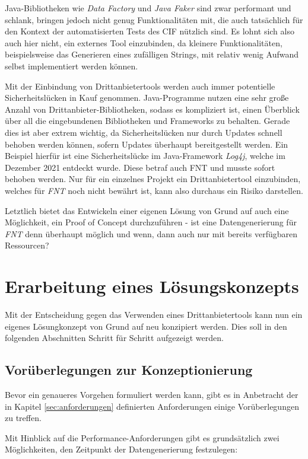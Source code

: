 Java-Bibliotheken wie \textit{Data Factory} und \textit{Java Faker} sind zwar performant und schlank, bringen jedoch nicht genug Funktionalitäten mit, die auch tatsächlich für den Kontext der automatisierten Tests des \ac{CIF} nützlich sind. Es lohnt sich also auch hier nicht, ein externes Tool einzubinden, da kleinere Funktionalitäten, beispielsweise das Generieren eines zufälligen Strings, mit relativ wenig Aufwand selbst implementiert werden können.

Mit der Einbindung von Drittanbietertools werden auch immer potentielle Sicherheitslücken in Kauf genommen. Java-Programme nutzen eine sehr große Anzahl von Drittanbieter-Bibliotheken, sodass es kompliziert ist, einen Überblick über all die eingebundenen Bibliotheken und Frameworks zu behalten. Gerade dies ist aber extrem wichtig, da Sicherheitslücken nur durch Updates schnell behoben werden können, sofern Updates überhaupt bereitgestellt werden. \cite{veracode:2021} Ein Beispiel hierfür ist eine Sicherheitslücke im Java-Framework \textit{Log4j}, welche im Dezember 2021 entdeckt wurde. Diese betraf auch FNT und musste sofort behoben werden. \cite{mit:2021} Nur für ein einzelnes Projekt ein Drittanbietertool einzubinden, welches für \textit{FNT} noch nicht bewährt ist, kann also durchaus ein Risiko darstellen.

Letztlich bietet das Entwickeln einer eigenen Lösung von Grund auf auch eine Möglichkeit, ein Proof of Concept durchzuführen - ist eine Datengenerierung für \textit{FNT} denn überhaupt möglich und wenn, dann auch nur mit bereits verfügbaren Ressourcen?

\section{Erarbeitung eines Lösungskonzepts}\label{sec:loesungskonzept}
Mit der Entscheidung gegen das Verwenden eines Drittanbietertools kann nun ein eigenes Lösungkonzept von Grund auf neu konzipiert werden. Dies soll in den folgenden Abschnitten Schritt für Schritt aufgezeigt werden.

\subsection{Vorüberlegungen zur Konzeptionierung}\label{subsec:vorueberlegungen}
Bevor ein genaueres Vorgehen formuliert werden kann, gibt es in Anbetracht der in Kapitel \ref{sec:anforderungen} definierten Anforderungen einige Vorüberlegungen zu treffen.

Mit Hinblick auf die Performance-Anforderungen gibt es grundsätzlich zwei Möglichkeiten, den Zeitpunkt der Datengenerierung festzulegen:

